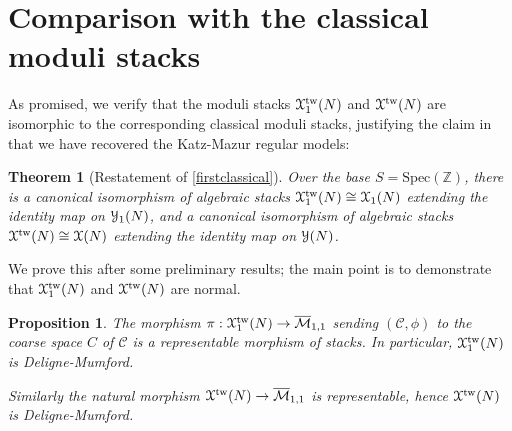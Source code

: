 \documentclass[11pt]{amsart}
\newtheorem{theorem}[subsection]{Theorem}
\newtheorem{proposition}[subsection]{Proposition}
\theoremstyle{definition}
\begin{document}
\section{Comparison with the classical moduli stacks}\label{compare}
As promised, we verify that the moduli stacks ${\mathbf{\EuScript{X}}}_1^{\mathrm{tw}}(N)$ and ${\mathbf{\EuScript{X}}}^{\mathrm{tw}}(N)$ are isomorphic to the corresponding classical moduli stacks, justifying the claim in \cite{AOV2} that we have recovered the Katz-Mazur regular models:
\begin{theorem}[Restatement of \ref{firstclassical}]\label{classical}
Over the base $S = \mathrm{Spec}(\mathbb{Z})$, there is a canonical isomorphism of algebraic stacks ${\mathbf{\EuScript{X}}}_1^{\mathrm{tw}}(N) \cong {\mathbf{\EuScript{X}}}_1(N)$ extending the identity map on ${\mathbf{\EuScript{Y}}}_1(N)$, and a canonical isomorphism of algebraic stacks ${\mathbf{\EuScript{X}}}^{\mathrm{tw}}(N) \cong {\mathbf{\EuScript{X}}}(N)$ extending the identity map on ${\mathbf{\EuScript{Y}}}(N)$.
\end{theorem}
We prove this after some preliminary results; the main point is to demonstrate that ${\mathbf{\EuScript{X}}}^{\mathrm{tw}}_1(N)$ and ${\mathbf{\EuScript{X}}}^{\mathrm{tw}}(N)$ are normal.

\begin{proposition}\label{gamma1auts}
The morphism $\pi:{\mathbf{\EuScript{X}}}^{\mathrm{tw}}_1(N) \rightarrow \overline{\mathcal{M}}_{1,1}$ sending $({\mathcal{C}},\phi)$ to the coarse space $C$ of ${\mathcal{C}}$ is a representable morphism of stacks. In particular, ${\mathbf{\EuScript{X}}}^{\mathrm{tw}}_1(N)$ is Deligne-Mumford.

Similarly the natural morphism ${\mathbf{\EuScript{X}}}^{\mathrm{tw}}(N) \rightarrow \overline{\mathcal{M}}_{1,1}$ is representable, hence ${\mathbf{\EuScript{X}}}^{\mathrm{tw}}(N)$ is Deligne-Mumford.
\end{proposition}
\end{document}
